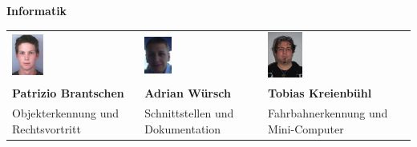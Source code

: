 \newpage
\large
\textbf{Informatik}
\begin{table}[H]
\begin{tabular}{p{}p{}p{}}	
	\includegraphics[width=0.26\textwidth]{./04_Projektmanagement/fig/patriziobrantschen.jpg}	&	\includegraphics[width=0.24\textwidth]{./04_Projektmanagement/fig/adrianwuersch.jpg} &
	\includegraphics[width=0.25\textwidth]{./04_Projektmanagement/fig/tobiaskreienbuehl.jpg} 
	\\
	\textbf{Patrizio Brantschen} & 	
	\textbf{Adrian Würsch} &
	\textbf{Tobias Kreienbühl}
	\\
	Objekterkennung und Rechtsvortritt &
	Schnittstellen und Dokumentation &
	Fahrbahnerkennung und Mini-Computer
\end{tabular}
\end{table}
\normalsize







